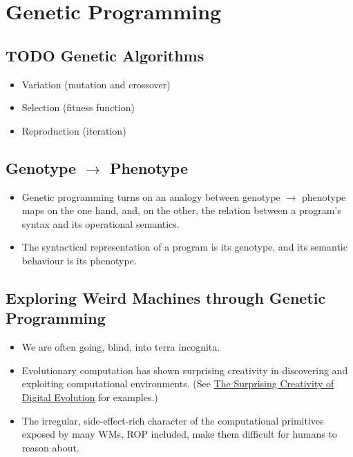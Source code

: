 \documentclass[11pt]{article}
\begin{document}
\section*{Genetic Programming}
\label{sec:org6618c18}
\subsection*{{\bfseries\sffamily TODO} Genetic Algorithms}
\label{sec:orgde0c582}
\begin{itemize}
\item Variation (mutation and crossover)
\item Selection (fitness function)
\item Reproduction (iteration)
\end{itemize}

\subsection*{Genotype \(\rightarrow\) Phenotype}
\label{sec:org9a2ab4d}

\begin{itemize}
\item Genetic programming turns on an analogy between genotype \(\rightarrow\) phenotype maps on the one hand, and, on the other, the relation between a program's syntax and its operational semantics.
\item The syntactical representation of a program is its genotype, and its semantic behaviour is its phenotype.
\end{itemize}

\subsection*{Exploring Weird Machines through Genetic Programming}
\label{sec:orgfc588dd}

\begin{itemize}
\item We are often going, blind, into terra incognita.
\item Evolutionary computation has shown surprising creativity
in discovering and exploiting computational environments.
(See \href{https://arxiv.org/abs/1803.03453}{The Surprising Creativity of Digital Evolution} for examples.)
\item The irregular, side-effect-rich character of the computational primitives
exposed by many WMs, ROP included, make them difficult for humans to reason about.
\end{itemize}
\end{document}
